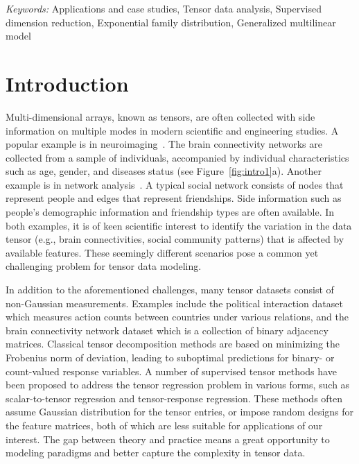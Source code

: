 \documentclass[12pt]{article}
\theoremstyle{definition}
\theoremstyle{definition}
\begin{document}
\noindent%
{\it Keywords:} Applications and case studies, Tensor data analysis, Supervised dimension reduction, Exponential family distribution, Generalized multilinear model
\vfill

\newpage
{} %
\section{Introduction}
\label{sec:intro}

Multi-dimensional arrays, known as tensors, are often collected with side information on multiple modes in modern scientific and engineering studies. A popular example is in neuroimaging~\citep{zhou2013tensor}. The brain connectivity networks are collected from a sample of individuals, accompanied by individual characteristics such as age, gender, and diseases status (see Figure~\ref{fig:intro1}a). Another example is in network analysis~\citep{pmlr-v108-berthet20a,hoff2005bilinear}. A typical social network consists of nodes that represent people and edges that represent  friendships. Side information such as people’s demographic information and friendship types are often available. In both examples, it is of keen scientific interest to identify the variation in the data tensor (e.g., brain connectivities, social community patterns) that is affected by available features. These seemingly different scenarios pose a common yet challenging problem for tensor data modeling. 

In addition to the aforementioned challenges, many tensor datasets consist of non-Gaussian measurements. Examples include the political interaction dataset \citep{nickel2011three} which measures action counts between countries under various relations, and the brain connectivity network dataset \citep{zhang2018mapping} which is a collection of binary adjacency matrices. Classical tensor decomposition methods are based on minimizing the Frobenius norm of deviation, leading to suboptimal predictions for binary- or count-valued response variables. A number of supervised tensor methods have been proposed \citep{narita2012tensor, zhao2012higher, yu2016learning,lock2018supervised} to address the tensor regression problem in various forms, such as scalar-to-tensor regression and tensor-response regression. These methods often assume Gaussian distribution for the tensor entries, or impose random designs for the feature matrices, both of which are less suitable for applications of our interest. The gap between theory and practice means a great opportunity to modeling paradigms and better capture the complexity in tensor data. 
\end{document}
